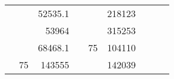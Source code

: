 \begin{table}[H]
\begin{tabular}{|ccrccrccc}
\multicolumn{1}{|c|}{\cellcolor[HTML]{FFFFC7}}                                & \multicolumn{1}{c|}{\cellcolor[HTML]{DAE8FC}}                      & \multicolumn{1}{r|}{\cellcolor[HTML]{DAE8FC}52535.1}   & \multicolumn{1}{c|}{\cellcolor[HTML]{FFFFC7}}                                & \multicolumn{1}{c|}{\cellcolor[HTML]{DAE8FC}}                       & \multicolumn{1}{r|}{\cellcolor[HTML]{DDFDFF}218123}    &                                                                              &                                                                    &                                                        \\ \cline{3-3} \cline{6-6}
\multicolumn{1}{|c|}{\cellcolor[HTML]{FFFFC7}}                                & \multicolumn{1}{c|}{\cellcolor[HTML]{DAE8FC}}                      & \multicolumn{1}{r|}{\cellcolor[HTML]{DDFDFF}53964}     & \multicolumn{1}{c|}{\cellcolor[HTML]{FFFFC7}}                                & \multicolumn{1}{c|}{\cellcolor[HTML]{DAE8FC}}                       & \multicolumn{1}{r|}{\cellcolor[HTML]{DAE8FC}315253}    &                                                                              &                                                                    &                                                        \\ \cline{3-3} \cline{6-6}
\multicolumn{1}{|c|}{\cellcolor[HTML]{FFFFC7}}                                & \multicolumn{1}{c|}{\cellcolor[HTML]{DAE8FC}}                      & \multicolumn{1}{r|}{\cellcolor[HTML]{DAE8FC}68468.1}   & \multicolumn{1}{c|}{\cellcolor[HTML]{FFFFC7}}                                & \multicolumn{1}{c|}{\multirow{-10}{*}{\cellcolor[HTML]{DAE8FC}75}}  & \multicolumn{1}{r|}{\cellcolor[HTML]{DDFDFF}104110}    &                                                                              &                                                                    &                                                        \\ \cline{3-3} \cline{5-6}
\multicolumn{1}{|c|}{\cellcolor[HTML]{FFFFC7}}                                & \multicolumn{1}{c|}{\multirow{-10}{*}{\cellcolor[HTML]{DAE8FC}75}} & \multicolumn{1}{r|}{\cellcolor[HTML]{DDFDFF}143555}    & \multicolumn{1}{c|}{\cellcolor[HTML]{FFFFC7}}                                & \multicolumn{1}{c|}{\cellcolor[HTML]{DDFDFF}}                       & \multicolumn{1}{r|}{\cellcolor[HTML]{DAE8FC}142039}    &                                                                              &                                                                    &                                                        \\ \cline{2-3} \cline{6-6}

\end{tabular}
\end{table}
